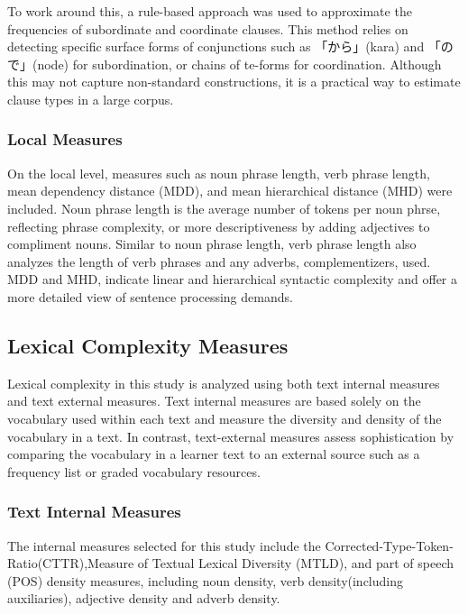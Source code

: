 To work around this, a rule-based approach was used to approximate the frequencies of subordinate and coordinate
clauses. This method relies on detecting specific surface forms of conjunctions such as 「から」(kara) and 「ので」(node)
for subordination, or chains of te-forms for coordination. Although this may not capture non-standard constructions,
it is a practical way to estimate clause types in a large corpus.

\subsubsection{Local Measures}
On the local level, measures such as noun phrase length, verb phrase length, mean dependency distance (MDD), and mean
hierarchical
distance (MHD) were included. Noun phrase length is the average number of tokens per noun phrse, reflecting phrase
complexity, or more descriptiveness by adding adjectives to compliment nouns.  Similar to noun phrase length, verb
phrase length also analyzes the length of verb phrases and any adverbs, complementizers, used.  MDD and MHD,
indicate linear and hierarchical syntactic complexity and offer a more detailed view of sentence processing demands.

\subsection{Lexical Complexity Measures}

Lexical complexity in this study is analyzed using both text internal measures and
text
external measures. Text internal measures are based solely on the vocabulary used within each text and measure the
diversity and density of the vocabulary in a text. In contrast, text-external measures assess sophistication by
comparing the vocabulary in a learner text to an external source such as a
frequency list or graded vocabulary resources.

\subsubsection{Text Internal Measures}
The internal measures selected for this study include the
Corrected-Type-Token-Ratio(CTTR),Measure of Textual Lexical Diversity (MTLD), and part of speech (POS) density
measures, including noun density, verb density(including auxiliaries), adjective density and adverb density.

